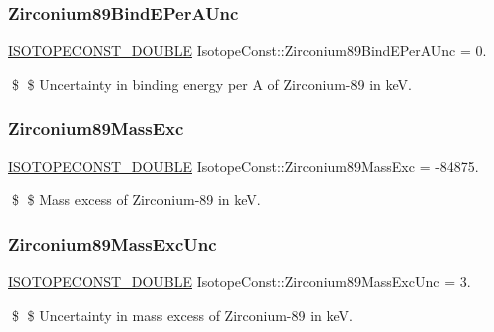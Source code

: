 \subsubsection{\texorpdfstring{Zirconium89\+Bind\+E\+Per\+A\+Unc}{Zirconium89BindEPerAUnc}}
{\footnotesize\ttfamily \mbox{\hyperlink{group___isotope_const-_macros_ga8f45a7272ce02c0b4c65c44636ed719a}{I\+S\+O\+T\+O\+P\+E\+C\+O\+N\+S\+T\+\_\+\+D\+O\+U\+B\+LE}} Isotope\+Const\+::\+Zirconium89\+Bind\+E\+Per\+A\+Unc = 0.}

\$ \$ Uncertainty in binding energy per A of Zirconium-\/89 in keV. \mbox{\label{group___isotope_const-_zirconium-_zr89_gaec438dc2b5de3860366b77295f51768c}} 
\subsubsection{\texorpdfstring{Zirconium89\+Mass\+Exc}{Zirconium89MassExc}}
{\footnotesize\ttfamily \mbox{\hyperlink{group___isotope_const-_macros_ga8f45a7272ce02c0b4c65c44636ed719a}{I\+S\+O\+T\+O\+P\+E\+C\+O\+N\+S\+T\+\_\+\+D\+O\+U\+B\+LE}} Isotope\+Const\+::\+Zirconium89\+Mass\+Exc = -\/84875.}

\$ \$ Mass excess of Zirconium-\/89 in keV. \mbox{\label{group___isotope_const-_zirconium-_zr89_ga2e8ba7954ba2bc1f4fa9e779b33e8c14}} 
\subsubsection{\texorpdfstring{Zirconium89\+Mass\+Exc\+Unc}{Zirconium89MassExcUnc}}
{\footnotesize\ttfamily \mbox{\hyperlink{group___isotope_const-_macros_ga8f45a7272ce02c0b4c65c44636ed719a}{I\+S\+O\+T\+O\+P\+E\+C\+O\+N\+S\+T\+\_\+\+D\+O\+U\+B\+LE}} Isotope\+Const\+::\+Zirconium89\+Mass\+Exc\+Unc = 3.}

\$ \$ Uncertainty in mass excess of Zirconium-\/89 in keV. \mbox{\label{group___isotope_const-_zirconium-_zr89_gaf617837c49e403f756316340c712a45d}} 
